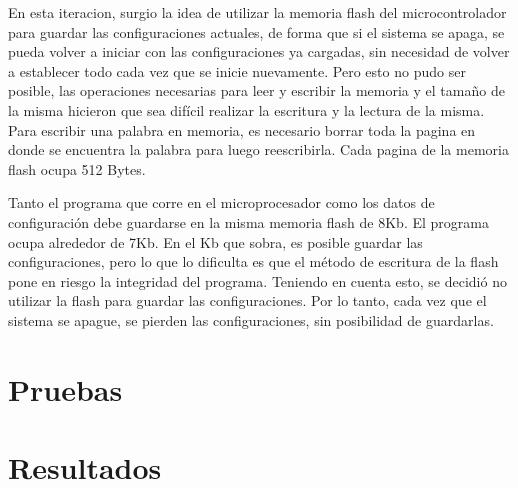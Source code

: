 En esta iteracion, surgio la idea de utilizar la memoria flash del microcontrolador para guardar las configuraciones actuales, de forma que si el sistema se apaga, se pueda volver a iniciar con las configuraciones ya cargadas, sin necesidad de volver a establecer todo cada vez que se inicie nuevamente. Pero esto no pudo ser posible, las operaciones necesarias para leer y escribir la memoria y el tamaño de la misma hicieron que sea difícil realizar la escritura y la lectura de la misma. Para escribir una palabra en memoria, es necesario borrar toda la pagina en donde se encuentra la palabra para luego reescribirla. Cada pagina de la memoria flash ocupa 512 Bytes.

Tanto el programa que corre en el microprocesador como los datos de configuración debe guardarse en la misma memoria flash de 8Kb. El programa ocupa alrededor de 7Kb. En el Kb que sobra, es posible guardar las configuraciones, pero lo que lo dificulta es que el método de escritura de la flash pone en riesgo la integridad del programa. Teniendo en cuenta esto, se decidió no utilizar la flash para guardar las configuraciones. Por lo tanto, cada vez que el sistema se apague, se pierden las configuraciones, sin posibilidad de guardarlas.



\section{Pruebas} %
\label{it5:sec:pruebas}


\section{Resultados} %
\label{it5:sec:resultados}



